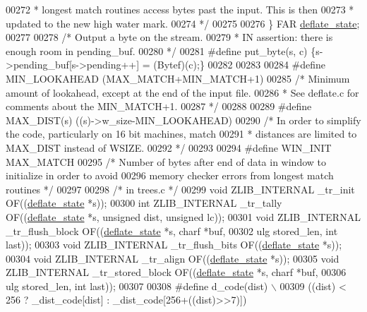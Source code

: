 \begin{DoxyCode}
00272 \textcolor{comment}{     * longest match routines access bytes past the input.  This is then}
00273 \textcolor{comment}{     * updated to the new high water mark.}
00274 \textcolor{comment}{     */}
00275 
00276 \} FAR \hyperlink{structinternal__state}{deflate\_state};
00277 
00278 \textcolor{comment}{/* Output a byte on the stream.}
00279 \textcolor{comment}{ * IN assertion: there is enough room in pending\_buf.}
00280 \textcolor{comment}{ */}
00281 \textcolor{preprocessor}{#define put\_byte(s, c) \{s->pending\_buf[s->pending++] = (Bytef)(c);\}}
00282 
00283 
00284 \textcolor{preprocessor}{#define MIN\_LOOKAHEAD (MAX\_MATCH+MIN\_MATCH+1)}
00285 \textcolor{comment}{/* Minimum amount of lookahead, except at the end of the input file.}
00286 \textcolor{comment}{ * See deflate.c for comments about the MIN\_MATCH+1.}
00287 \textcolor{comment}{ */}
00288 
00289 \textcolor{preprocessor}{#define MAX\_DIST(s)  ((s)->w\_size-MIN\_LOOKAHEAD)}
00290 \textcolor{comment}{/* In order to simplify the code, particularly on 16 bit machines, match}
00291 \textcolor{comment}{ * distances are limited to MAX\_DIST instead of WSIZE.}
00292 \textcolor{comment}{ */}
00293 
00294 \textcolor{preprocessor}{#define WIN\_INIT MAX\_MATCH}
00295 \textcolor{comment}{/* Number of bytes after end of data in window to initialize in order to avoid}
00296 \textcolor{comment}{   memory checker errors from longest match routines */}
00297 
00298         \textcolor{comment}{/* in trees.c */}
00299 \textcolor{keywordtype}{void} ZLIB\_INTERNAL \_tr\_init OF((\hyperlink{structinternal__state}{deflate\_state} *s));
00300 \textcolor{keywordtype}{int} ZLIB\_INTERNAL \_tr\_tally OF((\hyperlink{structinternal__state}{deflate\_state} *s, \textcolor{keywordtype}{unsigned} dist, \textcolor{keywordtype}{unsigned} lc));
00301 \textcolor{keywordtype}{void} ZLIB\_INTERNAL \_tr\_flush\_block OF((\hyperlink{structinternal__state}{deflate\_state} *s, charf *buf,
00302                         ulg stored\_len, \textcolor{keywordtype}{int} last));
00303 \textcolor{keywordtype}{void} ZLIB\_INTERNAL \_tr\_flush\_bits OF((\hyperlink{structinternal__state}{deflate\_state} *s));
00304 \textcolor{keywordtype}{void} ZLIB\_INTERNAL \_tr\_align OF((\hyperlink{structinternal__state}{deflate\_state} *s));
00305 \textcolor{keywordtype}{void} ZLIB\_INTERNAL \_tr\_stored\_block OF((\hyperlink{structinternal__state}{deflate\_state} *s, charf *buf,
00306                         ulg stored\_len, \textcolor{keywordtype}{int} last));
00307 
00308 \textcolor{preprocessor}{#define d\_code(dist) \(\backslash\)}
00309 \textcolor{preprocessor}{   ((dist) < 256 ? \_dist\_code[dist] : \_dist\_code[256+((dist)>>7)])}

\end{DoxyCode}
